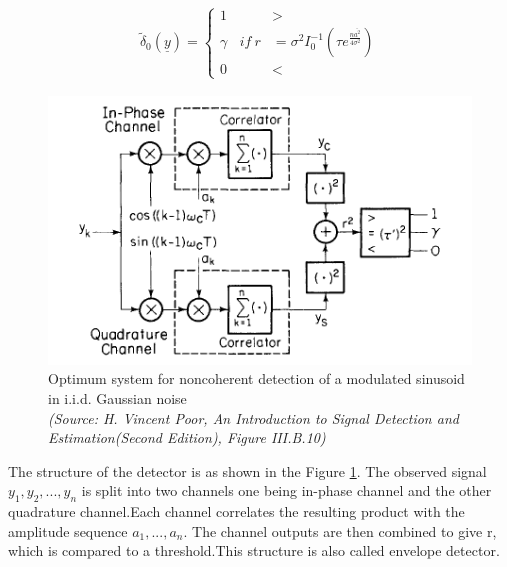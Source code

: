 \documentclass[a4paper,english,12pt]{article}
\begin{document}
\begin{align}
 \label{n18}
\tilde{\delta}_0 (\underline{y}) =  
\begin{cases}
1 &>  \\
\gamma  \ \ \ \  if \ r&= \sigma^2I_0^{-1} (\tau e^{\frac{n\bar{a^2}}{4\sigma^2}}) \\
0 &<
\end{cases}
\end{align}
\begin{figure}[hbtp]
	\centering
	\includegraphics[scale=0.75]{Figures/VP_III_B_10.png}
	\caption{Optimum system for noncoherent detection of a modulated sinusoid in i.i.d. Gaussian noise  \\ \textit{(Source: H. Vincent Poor, An Introduction to Signal Detection and Estimation(Second
			Edition), Figure III.B.10)}}
	\label{fn1}
\end{figure}
The structure of the detector is as shown in the  Figure \ref{fn1}. The observed signal $y_1,y_2,...,y_n$ is split into two channels one being in-phase channel and the other quadrature channel.Each channel correlates the resulting product with the amplitude sequence $a_1,...,a_n$. The channel outputs are then combined to give r, which is compared to a threshold.This structure is also called envelope detector.
\end{document}
